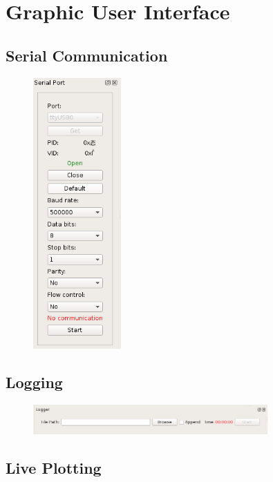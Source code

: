 \chapter{Graphic User Interface}

\section{Serial Communication}

\begin{figure}
\centering
\includegraphics[width=0.3\textwidth]{images/gui/serial-port}
\end{figure}

\section{Logging}

\begin{figure}
\centering
\includegraphics[width=0.8\textwidth]{images/gui/logger}
\end{figure}

\section{Live Plotting}

